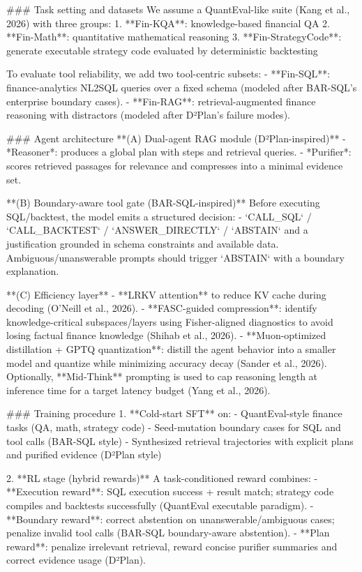 ### Task setting and datasets  
We assume a QuantEval-like suite (Kang et al., 2026) with three groups:  
1. **Fin-KQA**: knowledge-based financial QA  
2. **Fin-Math**: quantitative mathematical reasoning  
3. **Fin-StrategyCode**: generate executable strategy code evaluated by deterministic backtesting  

To evaluate tool reliability, we add two tool-centric subsets:  
- **Fin-SQL**: finance-analytics NL2SQL queries over a fixed schema (modeled after BAR-SQL’s enterprise boundary cases).  
- **Fin-RAG**: retrieval-augmented finance reasoning with distractors (modeled after D²Plan’s failure modes).  

### Agent architecture  
**(A) Dual-agent RAG module (D²Plan-inspired)**  
- *Reasoner*: produces a global plan with steps and retrieval queries.  
- *Purifier*: scores retrieved passages for relevance and compresses into a minimal evidence set.

**(B) Boundary-aware tool gate (BAR-SQL-inspired)**  
Before executing SQL/backtest, the model emits a structured decision:  
- `CALL_SQL` / `CALL_BACKTEST` / `ANSWER_DIRECTLY` / `ABSTAIN`  
and a justification grounded in schema constraints and available data.  
Ambiguous/unanswerable prompts should trigger `ABSTAIN` with a boundary explanation.

**(C) Efficiency layer**  
- **LRKV attention** to reduce KV cache during decoding (O’Neill et al., 2026).  
- **FASC-guided compression**: identify knowledge-critical subspaces/layers using Fisher-aligned diagnostics to avoid losing factual finance knowledge (Shihab et al., 2026).  
- **Muon-optimized distillation + GPTQ quantization**: distill the agent behavior into a smaller model and quantize while minimizing accuracy decay (Sander et al., 2026).  
Optionally, **Mid-Think** prompting is used to cap reasoning length at inference time for a target latency budget (Yang et al., 2026).

### Training procedure  
1. **Cold-start SFT** on:  
   - QuantEval-style finance tasks (QA, math, strategy code)  
   - Seed-mutation boundary cases for SQL and tool calls (BAR-SQL style)  
   - Synthesized retrieval trajectories with explicit plans and purified evidence (D²Plan style)  

2. **RL stage (hybrid rewards)**  
A task-conditioned reward combines:  
- **Execution reward**: SQL execution success + result match; strategy code compiles and backtests successfully (QuantEval executable paradigm).  
- **Boundary reward**: correct abstention on unanswerable/ambiguous cases; penalize invalid tool calls (BAR-SQL boundary-aware abstention).  
- **Plan reward**: penalize irrelevant retrieval, reward concise purifier summaries and correct evidence usage (D²Plan).  

